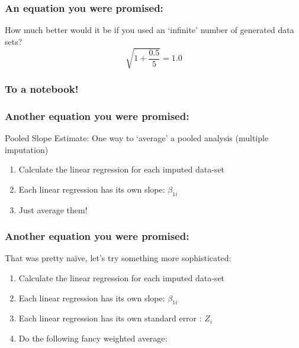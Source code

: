 \documentclass{beamer}
\newcommand{\blueit}[1]{%
  {\color{dark-lucid-blue}#1}%
}
\begin{document}
  \begin{frame}
    \frametitle{An equation you were promised:}
    How much better would it be if you used an `infinite' number of generated
    data sets?
    \begin{equation*}
      \sqrt{1 + \frac{0.5}{5}} = 1.0
    \end{equation*}
  \end{frame}

  \begin{frame}
    \frametitle{To a notebook!}
  \end{frame}

  \begin{frame}
    \frametitle{Another equation you were promised:}
    Pooled Slope Estimate: One way to `average' a pooled analysis (multiple imputation)
    \begin{enumerate}
      \item<2-> Calculate the linear regression for each imputed data-set
      \item<3-> Each linear regression has its own slope: $\beta_{1i}$
      \item<4-> Just average them!
    \end{enumerate}
  \end{frame}

  \begin{frame}
    \frametitle{Another equation you were promised:}
    That was pretty na\"{i}ve, let's try something more sophisticated:
    \begin{enumerate}
      \item<2-> Calculate the linear regression for each imputed data-set
      \item<3-> Each linear regression has its own slope: $\beta_{1i}$
      \item<4-> Each linear regression has its own \blueit{standard error}: $Z_{i}$
      \item<5-> Do the following fancy weighted average:
    \end{enumerate}
  \end{frame}
\end{document}
